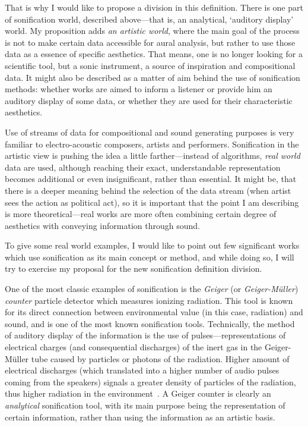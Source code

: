 \documentclass[12pt,a4paper,oneside]{report}
\begin{document}
That is why I would like to propose a division in this definition. There is one part of sonification world, described above---that is, an analytical, `auditory display' world. My proposition adds \emph{an artistic world}, where the main goal of the process is not to make certain data accessible for aural analysis, but rather to use those data as a essence of specific aesthetics. That means, one is no longer looking for a scientific tool, but a sonic instrument, a source of inspiration and compositional data. It might also be described as a matter of aim behind the use of sonification methods: whether works are aimed to inform a listener or provide him an auditory display of some data, or whether they are used for their characteristic aesthetics.

Use of streams of data for compositional and sound generating purposes is very familiar to electro-acoustic composers, artists and performers. Sonification in the artistic view is pushing the idea a little farther---instead of algorithms, \emph{real world} data are used, although reaching their exact, understandable representation becomes additional or even insignificant, rather than essential. It might be, that there is a deeper meaning behind the selection of the data stream (when artist sees the action as political act), so it is important that the point I am describing is more theoretical---real works are more often combining certain degree of aesthetics with conveying information through sound.

To give some real world examples, I would like to point out few significant works which use sonification as its main concept or method, and while doing so, I will try to exercise my proposal for the new sonification definition division.

One of the most classic examples of sonification is the \emph{Geiger} (or \emph{Geiger-Müller}) \emph{counter} particle detector which measures ionizing radiation. This tool is known for its direct connection between environmental value (in this case, radiation) and sound, and is one of the most known sonification tools. Technically, the method of auditory display of the information is the use of pulses---representations of electrical charges (and consequential discharges) of the inert gas in the {Geiger}-{Müller} tube caused by particles or photons of the radiation. Higher amount of electrical discharges (which translated into a higher number of audio pulses coming from the speakers) signals a greater density of particles of the radiation, thus higher radiation in the environment~\cite{Knoll2010}. A Geiger counter is clearly an \emph{analytical} sonification tool, with its main purpose being the representation of certain information, rather than using the information as an artistic basis.
\end{document}
